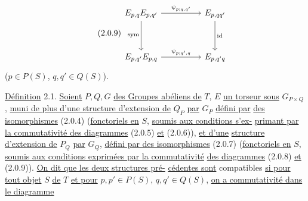 \begin{equation}\tag{2.0.9}
\begin{tikzcd}[column sep=huge, row sep=huge]
E_{p,q}E_{p,q'} \arrow[r, "{\psi_{p;q,q'}}"] \arrow[d, "\mathrm{sym}"'] & E_{p,qq'} \arrow[d, "\mathrm{id}"] \\
E_{p,q'}E_{p,q} \arrow[r, "{\psi_{p;q',q}}"] & E_{p,q'q}
\end{tikzcd}
\end{equation}
($p \in P(S)$, $q,q' \in Q(S)$).



\underline{Définition} 2.1. \underline{Soient} $P,Q,G$ \underline{des Groupes abéliens de} \underline{$T$}, $E$ \underline{un torseur sous}
$G_{P\times Q}$, \underline{muni de plus d'une structure d'extension de} $Q_P$ \underline{par} $G_P$ \underline{défini par}
\underline{des isomorphismes} (2.0.4) (\underline{fonctoriels en} $S$, \underline{soumis aux conditions s'ex-}
\underline{primant par la commutativité des diagrammes} (2.0.5) \underline{et} (2.0.6)), \underline{et d'une}
\underline{structure d'extension de} $P_Q$ \underline{par} $G_Q$, \underline{défini par des isomorphismes} (2.0.7)
(\underline{fonctoriels en} $S$, \underline{soumis aux conditions exprimées par la commutativité}
\underline{des diagrammes} (2.0.8) \underline{et} (2.0.9)). \underline{On dit que les deux structures pré-}
\underline{cédentes sont} compatibles \underline{si pour tout objet} $S$ \underline{de} \underline{$T$} \underline{et pour}
$p,p' \in P(S)$, $q,q' \in Q(S)$, \underline{on a commutativité dans le diagramme}

